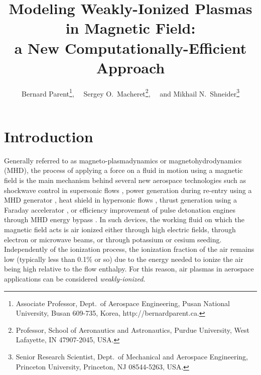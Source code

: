 \documentclass[twoside,onecolumn,10pt]{waflarticle}
\title{Modeling Weakly-Ionized Plasmas in Magnetic Field:\\ a New Computationally-Efficient Approach}
\author{  Bernard Parent\thanks{Associate Professor, Dept.\ of Aerospace Engineering, Pusan National University, Busan 609-735, Korea, http://bernardparent.ca.},
          ~~Sergey O.\ Macheret\thanks{Professor, School of Aeronautics and Astronautics, Purdue University, West Lafayette, IN 47907-2045, USA.},
          ~~and Mikhail N.\ Shneider\thanks{Senior Research Scientist, Dept.\ of Mechanical and Aerospace Engineering, Princeton University, Princeton, NJ 08544-5263, USA.}\\
}
\begin{document}
\pagestyle{fancy}
\fancyhead{}
\renewcommand{\headrulewidth}{0.0pt}

  \setcounter{page}{1}
  \maketitle

\linespread{1.05}






\section{Introduction}

\dropword Generally referred to as magneto-plasmadynamics or magnetohydrodynamics (MHD), the process of applying a force on a fluid in motion using a magnetic field is the main mechanism behind several new aerospace technologies such as shockwave control in supersonic flows   \cite{pof:2002:poggie,aiaa:2004:shneider}, power generation during re-entry using a MHD generator  \cite{jpp:2009:fujino,aiaa:2009:wan,jsr:2012:kim}, heat shield in hypersonic flows \cite{jsr:2013:bizek,jsr:2012:kawamura},  thrust generation using a Faraday accelerator \cite{jpp:2005:parent,jpp:2007:parent}, or efficiency improvement of pulse detonation engines through MHD energy bypass \cite{jpp:2012:zeineh}. In such devices, the working fluid on which the magnetic field acts is air ionized either through high electric fields, through electron or microwave beams, or through potassium or cesium seeding. Independently of the ionization process, the  ionization fraction of the air remains low (typically less than 0.1\% or so) due to the energy needed to ionize the air being high relative to the flow enthalpy. For this reason, air plasmas in aerospace applications can be considered  \emph{weakly-ionized}.  %
\end{document}
